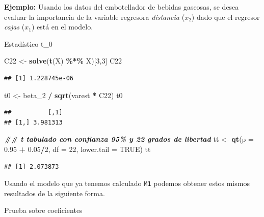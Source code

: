 \documentclass[
]{book}
\newenvironment{Shaded}{\begin{snugshade}}{\end{snugshade}}
\newcommand{\AttributeTok}[1]{\textcolor[rgb]{0.13,0.29,0.53}{#1}}
\newcommand{\ConstantTok}[1]{\textcolor[rgb]{0.56,0.35,0.01}{#1}}
\newcommand{\DecValTok}[1]{\textcolor[rgb]{0.00,0.00,0.81}{#1}}
\newcommand{\DocumentationTok}[1]{\textcolor[rgb]{0.56,0.35,0.01}{\textbf{\textit{#1}}}}
\newcommand{\FloatTok}[1]{\textcolor[rgb]{0.00,0.00,0.81}{#1}}
\newcommand{\FunctionTok}[1]{\textcolor[rgb]{0.13,0.29,0.53}{\textbf{#1}}}
\newcommand{\NormalTok}[1]{#1}
\newcommand{\OtherTok}[1]{\textcolor[rgb]{0.56,0.35,0.01}{#1}}
\newcommand{\SpecialCharTok}[1]{\textcolor[rgb]{0.81,0.36,0.00}{\textbf{#1}}}
\begin{document}
\textbf{Ejemplo:} Usando los datos del embotellador de bebidas gaseosas, se desea evaluar la importancia de la variable regresora \emph{distancia} (\(x_2\)) dado que el regresor \emph{cajas} (\(x_1\)) está en el modelo.

Estadístico t\_0

\begin{Shaded}
\begin{Highlighting}[]
\NormalTok{C22 }\OtherTok{\textless{}{-}} \FunctionTok{solve}\NormalTok{(}\FunctionTok{t}\NormalTok{(X) }\SpecialCharTok{\%*\%}\NormalTok{ X)[}\DecValTok{3}\NormalTok{,}\DecValTok{3}\NormalTok{]}
\NormalTok{C22}
\end{Highlighting}
\end{Shaded}

\begin{verbatim}
## [1] 1.228745e-06
\end{verbatim}

\begin{Shaded}
\begin{Highlighting}[]
\NormalTok{t0 }\OtherTok{\textless{}{-}}\NormalTok{ beta\_2 }\SpecialCharTok{/} \FunctionTok{sqrt}\NormalTok{(varest }\SpecialCharTok{*}\NormalTok{ C22)}
\NormalTok{t0}
\end{Highlighting}
\end{Shaded}

\begin{verbatim}
##          [,1]
## [1,] 3.981313
\end{verbatim}

\begin{Shaded}
\begin{Highlighting}[]
\DocumentationTok{\#\# t tabulado con confianza 95\% y 22 grados de libertad}
\NormalTok{tt }\OtherTok{\textless{}{-}} \FunctionTok{qt}\NormalTok{(}\AttributeTok{p =} \FloatTok{0.95} \SpecialCharTok{+} \FloatTok{0.05}\SpecialCharTok{/}\DecValTok{2}\NormalTok{, }\AttributeTok{df =} \DecValTok{22}\NormalTok{, }\AttributeTok{lower.tail =} \ConstantTok{TRUE}\NormalTok{)}
\NormalTok{tt}
\end{Highlighting}
\end{Shaded}

\begin{verbatim}
## [1] 2.073873
\end{verbatim}

Usando el modelo que ya tenemos calculado \texttt{M1} podemos obtener estos mismos resultados de la siguiente forma.

Prueba sobre coeficientes
\end{document}
